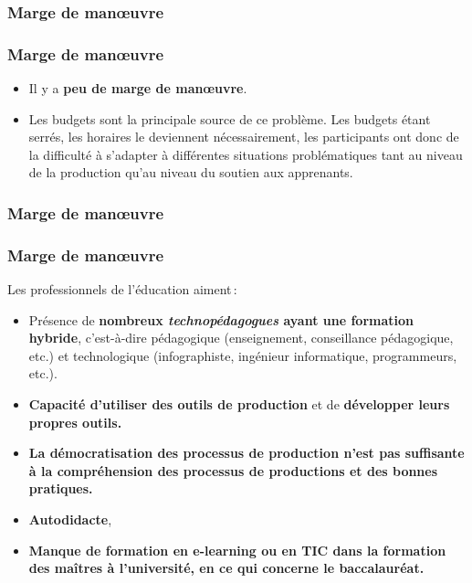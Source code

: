 					\subsubsection{Marge de manœuvre} 
						\begin{frame}[allowframebreaks]
						\frametitle{Marge de manœuvre}
                        			
                        			\begin{itemize}
                        			\item Il y a \textbf{peu de marge de manœuvre}. 
                        			\item Les budgets sont la principale source de ce problème. Les budgets étant serrés, les horaires le deviennent nécessairement, les participants ont donc de la difficulté à s’adapter à différentes situations problématiques tant au niveau de la production qu’au niveau du soutien aux apprenants.
                        				
						\end{itemize}
						\end{frame}	
						
					\subsubsection{Marge de manœuvre} 
						\begin{frame}[allowframebreaks]
						\frametitle{Marge de manœuvre}
                        			Les professionnels de l'éducation aiment\,: 
                        			\begin{itemize}
                        			\item Présence de \textbf{nombreux \textit{technopédagogues} ayant une formation hybride}, c’est-à-dire pédagogique (enseignement, conseillance pédagogique, etc.) et technologique (infographiste, ingénieur informatique, programmeurs, etc.). 
                        			\item \textbf{Capacité d’utiliser des outils de production} et de \textbf{développer leurs propres outils.} 
                        			\item\textbf{ La démocratisation des processus de production n’est pas suffisante à la compréhension des processus de productions et des bonnes pratiques.}
						\item \textbf{Autodidacte}, 
						\item \textbf{Manque de formation en e-learning ou en TIC dans la formation des maîtres à l’université, en ce qui concerne le baccalauréat.}

                        				
						\end{itemize}
						\end{frame}	
						
